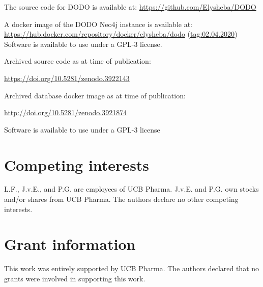 \documentclass[9pt,a4paper,]{extarticle}
\begin{document}
The source code for DODO is available at: \url{https://github.com/Elysheba/DODO}

A docker image of the DODO Neo4j instance is available at: \url{https://hub.docker.com/repository/docker/elysheba/dodo} (\url{tag:02.04.2020}) Software is available to use under a GPL-3 license.

Archived source code as at time of publication:

\url{https://doi.org/10.5281/zenodo.3922143} \citep{Francois2020}

Archived database docker image as at time of publication:

\url{http://doi.org/10.5281/zenodo.3921874} \citep{Francois2020b}

Software is available to use under a GPL-3 license

\hypertarget{competing-interests}{%
\section{Competing interests}\label{competing-interests}}

L.F., J.v.E., and P.G. are employees of UCB Pharma. J.v.E. and P.G. own stocks and/or shares from UCB Pharma. The authors declare no other competing interests.

\hypertarget{grant-information}{%
\section{Grant information}\label{grant-information}}

This work was entirely supported by UCB Pharma. The authors declared that no grants were involved in supporting this work.

\renewcommand\refname{References}
{\small}
\end{document}

